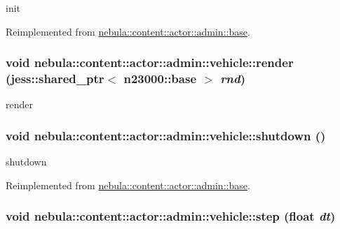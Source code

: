init 

Reimplemented from \hyperlink{classnebula_1_1content_1_1actor_1_1admin_1_1base_ab7aac539b0e1e06102bbb4b572d529cd}{nebula::content::actor::admin::base}.\hypertarget{classnebula_1_1content_1_1actor_1_1admin_1_1vehicle_adf96a8df29b0e524bad0fee36aad92b4}{
\subsubsection[{render}]{\setlength{\rightskip}{0pt plus 5cm}void nebula::content::actor::admin::vehicle::render (jess::shared\_\-ptr$<$ {\bf n23000::base} $>$ {\em rnd})}}
\label{classnebula_1_1content_1_1actor_1_1admin_1_1vehicle_adf96a8df29b0e524bad0fee36aad92b4}


render \hypertarget{classnebula_1_1content_1_1actor_1_1admin_1_1vehicle_af9d76795459cf3acad5c5ec5a9b5b13b}{
\subsubsection[{shutdown}]{\setlength{\rightskip}{0pt plus 5cm}void nebula::content::actor::admin::vehicle::shutdown ()}}
\label{classnebula_1_1content_1_1actor_1_1admin_1_1vehicle_af9d76795459cf3acad5c5ec5a9b5b13b}


shutdown 

Reimplemented from \hyperlink{classnebula_1_1content_1_1actor_1_1admin_1_1base_a5f8943404407602a6757d3ab448d4a75}{nebula::content::actor::admin::base}.\hypertarget{classnebula_1_1content_1_1actor_1_1admin_1_1vehicle_a3d1b3aec177cf3c759029a487b1c2c9d}{
\subsubsection[{step}]{\setlength{\rightskip}{0pt plus 5cm}void nebula::content::actor::admin::vehicle::step (float {\em dt})}}
\label{classnebula_1_1content_1_1actor_1_1admin_1_1vehicle_a3d1b3aec177cf3c759029a487b1c2c9d}


